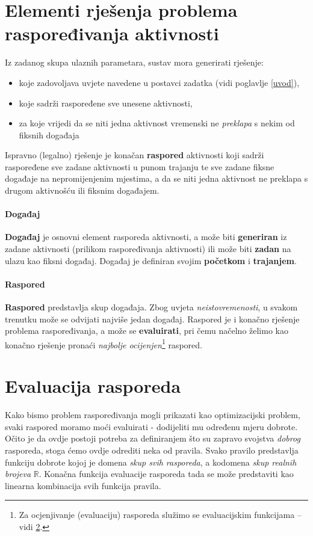 \documentclass[times, utf8, zavrsni]{fer}
\begin{document}
\section{Elementi rješenja problema raspoređivanja aktivnosti}\label{elementi rjesenja}
Iz zadanog skupa ulaznih parametara, sustav mora generirati rješenje:
\begin{itemize}
  \item koje zadovoljava uvjete navedene u postavci zadatka (vidi poglavlje \ref{uvod}),
  \item koje sadrži raspoređene sve unesene aktivnosti,
  \item za koje vrijedi da se niti jedna aktivnost vremenski ne \textit{preklapa} s nekim od fiksnih događaja
\end{itemize}

Ispravno (legalno) rješenje je konačan \textbf{raspored} aktivnosti koji sadrži raspoređene sve zadane aktivnosti u punom trajanju te sve zadane fiksne događaje na nepromijenjenim mjestima, a da se niti jedna aktivnost ne preklapa s drugom aktivnošću ili fiksnim događajem.

\paragraph{Događaj} \textbf{Događaj} je osnovni element rasporeda aktivnosti, a može biti \textbf{generiran} iz zadane aktivnosti (prilikom raspoređivanja aktivnosti) ili može biti \textbf{zadan} na ulazu kao fiksni događaj. Događaj je definiran svojim \textbf{početkom} i \textbf{trajanjem}.

\paragraph{Raspored} \textbf{Raspored} predstavlja skup događaja. Zbog uvjeta \textit{neistovremenosti}, u svakom trenutku može se odvijati najviše jedan događaj. Raspored je i konačno rješenje problema raspoređivanja, a može se \textbf{evaluirati}, pri čemu načelno želimo kao konačno rješenje pronaći \textit{najbolje ocijenjen}\footnote{Za ocjenjivanje (evaluaciju) rasporeda služimo se evaluacijskim funkcijama -- vidi \ref{evaluacija rasporeda}.} raspored.

\section{Evaluacija rasporeda}\label{evaluacija rasporeda}
Kako bismo problem raspoređivanja mogli prikazati kao optimizacijski problem, svaki raspored moramo moći evaluirati - dodijeliti mu određenu mjeru dobrote. Očito je da ovdje postoji potreba za definiranjem što su zapravo svojstva \textit{dobrog} rasporeda, stoga ćemo ovdje odrediti neka od pravila. Svako pravilo predstavlja funkciju dobrote kojoj je domena \textit{skup svih rasporeda}, a kodomena \textit{skup realnih brojeva} $\mathbb{R}$. Konačna funkcija evaluacije rasporeda tada se može predstaviti kao linearna kombinacija svih funkcija pravila.
\end{document}
